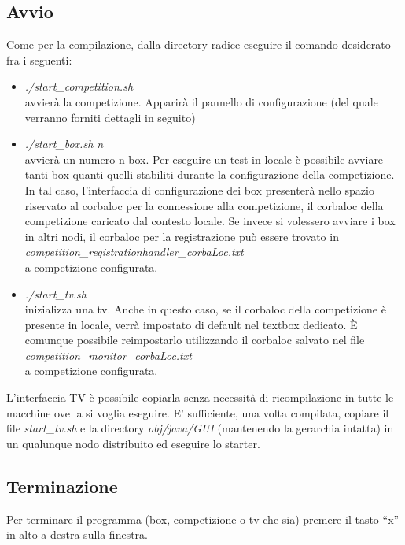 \subsection{Avvio}
Come per la compilazione, dalla directory radice eseguire il comando desiderato fra i seguenti:
\begin{itemize}
\item \emph{./start\_competition.sh}\\
avvier\`{a} la competizione. Apparir\`{a} il pannello di configurazione (del quale verranno forniti dettagli in seguito)
\item \emph{./start\_box.sh n}\\
avvier\`{a} un numero n box. Per eseguire un test in locale \`{e} possibile avviare tanti box quanti quelli stabiliti durante la configurazione
della competizione. In tal caso, l'interfaccia di configurazione dei box presenter\`{a} nello spazio riservato al corbaloc per la connessione
alla competizione, il corbaloc della competizione caricato dal contesto locale. Se invece si volessero avviare i box in altri nodi, il corbaloc
per la registrazione pu\`{o} essere trovato in \\
\emph{competition\_registrationhandler\_corbaLoc.txt}\\
a competizione configurata. 
\item \emph{./start\_tv.sh}\\
inizializza una tv. Anche in questo caso, se il corbaloc della competizione \`{e} presente in locale, verr\`{a} impostato di default nel textbox
dedicato. \`{E} comunque possibile reimpostarlo utilizzando il corbaloc salvato nel file\\
\emph{competition\_monitor\_corbaLoc.txt}\\
a competizione configurata.
\end{itemize}
L'interfaccia TV \`{e} possibile copiarla senza necessit\`{a} di ricompilazione in tutte le macchine ove la si voglia eseguire. E' sufficiente,
una volta compilata, copiare il file \emph{start\_tv.sh} e la directory \emph{obj/java/GUI} (mantenendo la gerarchia intatta) in un qualunque
nodo distribuito ed eseguire lo starter.
\subsection{Terminazione}
Per terminare il programma (box, competizione o tv che sia) premere il tasto ``x'' in alto a destra sulla finestra.
